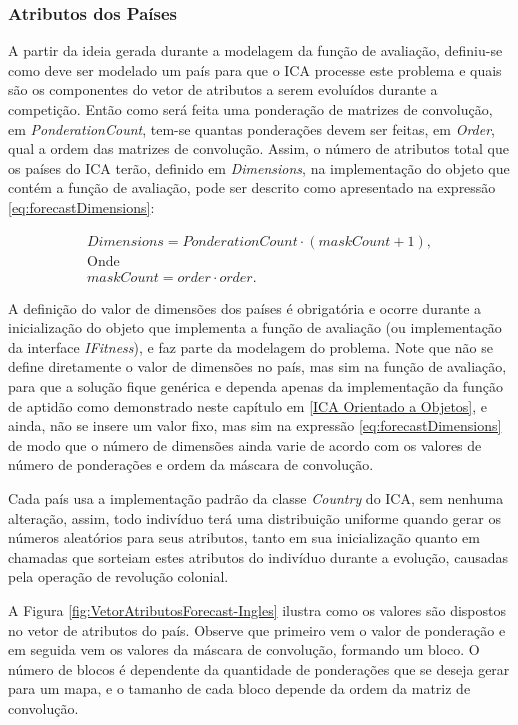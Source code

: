 \subsubsection{Atributos dos Países}
\label{Atributos dos Países}

A partir da ideia gerada durante a modelagem da função de avaliação, definiu-se como deve ser modelado um país para que o ICA processe este problema e quais são os componentes do vetor de atributos a serem evoluídos durante a competição. Então como será feita uma ponderação de matrizes de convolução, em \emph{PonderationCount}, tem-se quantas ponderações devem ser feitas, em \emph{Order}, qual a ordem das matrizes de convolução. Assim, o número de atributos total que os países do ICA terão, definido em \emph{Dimensions}, na implementação do objeto que contém a função de avaliação, pode ser descrito como apresentado na expressão \ref{eq:forecastDimensions}: 
	
\begin{equation}
\label{eq:forecastDimensions}
\begin{split}
Dimensions = PonderationCount \cdot (maskCount + 1), 
\\\text{Onde}
\\maskCount = order \cdot order.
\end{split}
\end{equation}

A definição do valor de dimensões dos países é obrigatória e ocorre durante a inicialização do objeto que implementa a função de  avaliação (ou implementação da interface \emph{IFitness}), e faz parte da modelagem do problema. Note que não se define diretamente o valor de dimensões no país, mas sim na função de avaliação, para  que a solução fique genérica e dependa apenas da implementação da função de aptidão como demonstrado neste capítulo em \ref{ICA Orientado a Objetos}, e ainda, não se insere um valor fixo, mas sim na expressão \ref{eq:forecastDimensions} de modo que o número de dimensões ainda varie de acordo com os valores de número de ponderações e ordem da máscara de convolução.

Cada país usa a implementação padrão da classe \emph{Country} do ICA, sem nenhuma alteração, assim, todo indivíduo terá uma distribuição uniforme quando gerar os números aleatórios para seus atributos, tanto em sua inicialização quanto em chamadas que sorteiam estes atributos do indivíduo durante a evolução, causadas pela operação de revolução colonial.

A Figura \ref{fig:VetorAtributosForecast-Ingles} ilustra como os valores são dispostos no vetor de atributos do país. Observe que primeiro vem o valor de ponderação e em seguida vem os valores da máscara de convolução, formando um bloco. O número de blocos é dependente da quantidade de ponderações que se deseja gerar para um mapa, e o tamanho de cada bloco depende da ordem da matriz de convolução.


